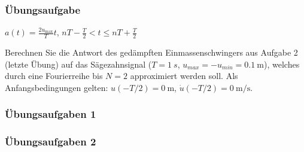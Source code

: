 \documentclass[hyperref={pdfpagemode=FullScreen, colorlinks=false}]{beamer}
\begin{document}
\begin{frame}
\frametitle{Übungsaufgabe}
$a(t)=\frac{2u_\mathrm{max}}{T}t$, \quad
$nT-\frac{T}{2} < t \le nT+\frac{T}{2}$
\hfill


\bigskip

Berechnen Sie die Antwort des gedämpften Einmassenschwingers aus Aufgabe 2 (letzte Übung) auf das Sägezahnsignal ($T=\SI{1}{s}$, $u_{max}=-u_{min}=\SI{0.1}{\metre}$), welches durch eine Fourierreihe bis $N=2$ approximiert werden soll.
Als Anfangsbedingungen gelten: $u(-T/2)=\SI{0}{\metre}$, $\dot{u}(-T/2)=\SI{0}{\metre\per\second}$.
\end{frame}


\begin{frame}
\frametitle{Übungsaufgaben 1}
 

 
\end{frame}

\begin{frame}
\frametitle{Übungsaufgaben 2}

\end{frame}
\end{document}

